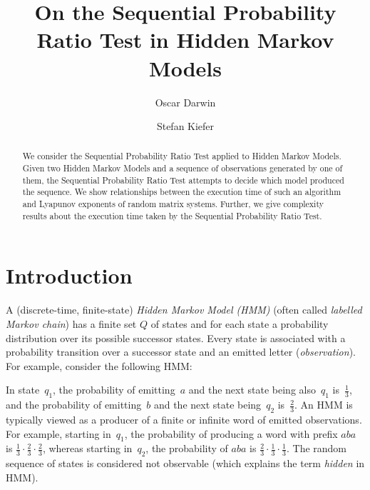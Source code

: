 \documentclass[a4paper,UKenglish,cleveref, autoref,mathscr]{lipics-v2019}
\title{On the Sequential Probability Ratio Test in Hidden Markov Models}
\author{Oscar Darwin}{Department of Computer Science, Oxford University, United Kingdom }{}{https://orcid.org/0000-0001-5016-014X}{}%
\author{Stefan Kiefer}{Department of Computer Science, Oxford University, United Kingdom}{}{https://orcid.org/0000-0003-4173-6877}{}
\newcommand{\1}{\mathbbm{1}}
\begin{document}
\maketitle

\begin{abstract}
We consider the Sequential Probability Ratio Test applied to Hidden Markov Models. Given two Hidden Markov Models and a sequence of observations generated by one of them, the Sequential Probability Ratio Test attempts to decide which model produced the sequence. We show relationships between the execution time of such an algorithm and Lyapunov exponents of random matrix systems. Further, we give complexity results about the execution time taken by the Sequential Probability Ratio Test.
\end{abstract}

\section{Introduction}

A (discrete-time, finite-state) \emph{Hidden Markov Model (HMM)} (often called \emph{labelled Markov chain}) has a finite set $Q$ of states and for each state a probability distribution over its possible successor states.
Every state is associated with a probability transition over a successor state and an emitted letter (\emph{observation}).
For example, consider the following HMM:
\begin{center}
\end{center}
In state~$q_1$, the probability of emitting~$a$ and the next state being also~$q_1$ is~$\frac13$, and the probability of emitting~$b$ and the next state being~$q_2$ is~$\frac23$.
An HMM is typically viewed as a producer of a finite or infinite word of emitted observations.
For example, starting in~$q_1$, the probability of producing a word with prefix $a b a$ is $\frac13 \cdot \frac23 \cdot \frac23$, whereas starting in~$q_2$, the probability of $a b a$ is $\frac23 \cdot \frac13 \cdot \frac13$.
The random sequence of states is considered not observable (which explains the term \emph{hidden} in HMM).
\end{document}
